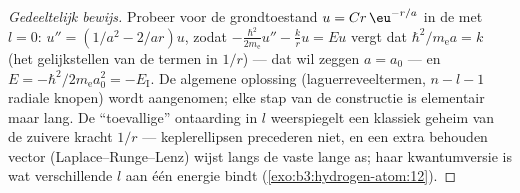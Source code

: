 \begin{proof}[Gedeeltelijk bewijs]
Probeer voor de grondtoestand $u = Cr\,\eu^{-r/a}$ in de  met $l = 0$: $u'' = (1/a^2 - 2/ar)u$, zodat
$-\tfrac{\hbar^2}{2m_{\text{e}}}u'' - \tfrac kr u = Eu$ vergt dat
$\hbar^2/m_{\text{e}}a = k$ (het gelijkstellen van de termen in $1/r$) ---
dat wil zeggen $a = a_0$ --- en $E = -\hbar^2/2m_{\text{e}}a_0^2 = -E_{\text{I}}$. De algemene oplossing (laguerreveeltermen, $n - l - 1$
radiale knopen) wordt aangenomen; elke stap van de constructie is
elementair maar lang. De ``toevallige'' ontaarding in $l$ weerspiegelt een
klassiek geheim van de zuivere kracht $1/r$ --- keplerellipsen precederen
niet, en een extra behouden vector (Laplace--Runge--Lenz) wijst langs de
vaste lange as; haar kwantumversie is wat verschillende $l$ aan één
energie bindt (\cref{exo:b3:hydrogen-atom:12}).
\end{proof}

